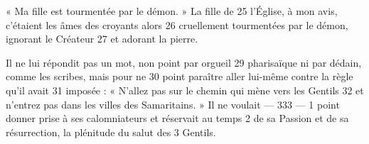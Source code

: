 « Ma fille est tourmentée par le démon. » La fille de	 
25	 	l'Église, à mon avis, c'étaient les âmes des croyants alors	 
26	 	cruellement tourmentées par le démon, ignorant le Créateur	 
27	 	et adorant la pierre.

Il ne lui répondit pas un mot, non point par orgueil	 
29	 	pharisaïque ni par dédain, comme les scribes, mais pour ne	 
30	 	point paraître aller lui-même contre la règle qu'il avait	 
31	 	imposée : « N'allez pas sur le chemin qui mène vers les Gentils	 
32	 	et n'entrez pas dans les villes des Samaritains. » Il ne voulait	 
 	--- 333 ---	 
1	 	point donner prise à ses calomniateurs et réservait au temps	 
2	 	de sa Passion et de sa résurrection, la plénitude du salut des	 
3	 	Gentils.